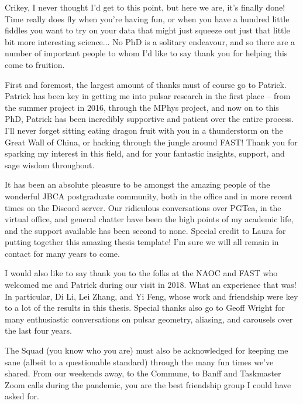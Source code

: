 
\begin{acknowledgements}
    \addchaptertocentry{\acknowledgementname} %
    
    Crikey, I never thought I'd get to this point, but here we are, it’s finally done! Time really does fly when you're having fun, or when you have a hundred little fiddles you want to try on your data that might just squeeze out just that little bit more interesting science... No PhD is a solitary endeavour, and so there are a number of important people to whom I'd like to say thank you for helping this come to fruition.

    First and foremost, the largest amount of thanks must of course go to Patrick. Patrick has been key in getting me into pulsar research in the first place -- from the summer project in 2016, through the MPhys project, and now on to this PhD, Patrick has been incredibly supportive and patient over the entire process. I’ll never forget sitting eating dragon fruit with you in a thunderstorm on the Great Wall of China, or hacking through the jungle around FAST! Thank you for sparking my interest in this field, and for your fantastic insights, support, and sage wisdom throughout.
        
    It has been an absolute pleasure to be amongst the amazing people of the wonderful JBCA postgraduate community, both in the office and in more recent times on the Discord server. Our ridiculous conversations over PGTea, in the virtual office, and general chatter have been the high points of my academic life, and the support available has been second to none. Special credit to Laura for putting together this amazing thesis template! I'm sure we will all remain in contact for many years to come.
      
    I would also like to say thank you to the folks at the NAOC and FAST who welcomed me and Patrick during our visit in 2018. What an experience that was! In particular, Di Li, Lei Zhang, and Yi Feng, whose work and friendship were key to a lot of the results in this thesis. Special thanks also go to Geoff Wright for many enthusiastic conversations on pulsar geometry, aliasing, and carousels over the last four years.
    
    The Squad (you know who you are) must also be acknowledged for keeping me sane (albeit to a questionable standard) through the many fun times we've shared. From our weekends away, to the Commune, to Banff and Taskmaster Zoom calls during the pandemic, you are the best friendship group I could have asked for.
    

\end{acknowledgements}
